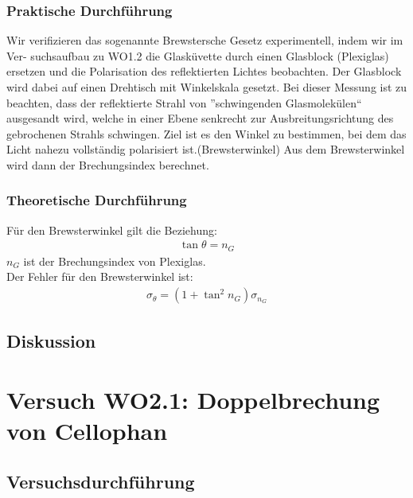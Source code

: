 \documentclass[12pt]{scrartcl}
\begin{document}
\subsubsection{Praktische Durchführung}
Wir verifizieren das sogenannte Brewstersche Gesetz experimentell, indem wir im Ver-
suchsaufbau zu WO1.2 die Glasküvette durch einen Glasblock (Plexiglas) ersetzen und
die Polarisation des reflektierten Lichtes beobachten.
Der Glasblock wird dabei auf einen Drehtisch mit Winkelskala gesetzt.
Bei dieser Messung ist zu beachten, dass der reflektierte Strahl von ”schwingenden Glasmolekülen“ ausgesandt wird, welche in einer Ebene
senkrecht zur Ausbreitungsrichtung des gebrochenen Strahls schwingen.
Ziel ist es den Winkel zu bestimmen, bei dem das Licht nahezu vollständig polarisiert ist.(Brewsterwinkel)
Aus dem Brewsterwinkel wird dann %
der Brechungsindex berechnet.
\subsubsection{Theoretische Durchführung}
Für den Brewsterwinkel gilt die Beziehung:
\begin{align}
\tan{\theta} = n_G
\end{align}
$n_G$ ist der Brechungsindex von Plexiglas.\\
Der Fehler für den Brewsterwinkel ist:
\begin{align}
\sigma_\theta = (1+\tan^2{n_G})\sigma_{n_G}
\end{align}
\subsection{Diskussion}

\section{Versuch WO2.1:
Doppelbrechung von Cellophan}
\subsection{Versuchsdurchführung}
\end{document}
